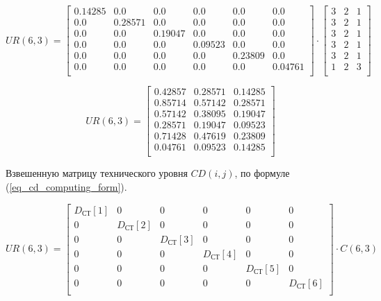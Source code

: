 $$
    UR(6,3) =
        \begin{bmatrix}
            0.14285 & 0.0     & 0.0     & 0.0     & 0.0     & 0.0     \\
            0.0     & 0.28571 & 0.0     & 0.0     & 0.0     & 0.0     \\
            0.0     & 0.0     & 0.19047 & 0.0     & 0.0     & 0.0     \\
            0.0     & 0.0     & 0.0     & 0.09523 & 0.0     & 0.0     \\
            0.0     & 0.0     & 0.0     & 0.0     & 0.23809 & 0.0     \\
            0.0     & 0.0     & 0.0     & 0.0     & 0.0     & 0.04761 \\
        \end{bmatrix}
        \cdot
        \begin{bmatrix}
            3 & 2 & 1 \\
            3 & 2 & 1 \\
            3 & 2 & 1 \\
            3 & 2 & 1 \\
            3 & 2 & 1 \\
            1 & 2 & 3 \\
        \end{bmatrix}
$$

\begin{equation}
    UR(6,3) =
        \begin{bmatrix}
            0.42857 & 0.28571 & 0.14285 \\
            0.85714 & 0.57142 & 0.28571 \\
            0.57142 & 0.38095 & 0.19047 \\
            0.28571 & 0.19047 & 0.09523 \\
            0.71428 & 0.47619 & 0.23809 \\
            0.04761 & 0.09523 & 0.14285 \\
        \end{bmatrix}
    \label{eq_ur_rez}
\end{equation}

Взвешенную матрицу технического уровня $CD(i, j)$, по формуле
(\ref{eq_cd_computing_form}).

\begin{equation}
    UR(6,3) =
        \begin{bmatrix}
            D_\text{СТ}[1] & 0 & 0 & 0 & 0 & 0 \\
            0 & D_\text{СТ}[2] & 0 & 0 & 0 & 0 \\
            0 & 0 & D_\text{СТ}[3] & 0 & 0 & 0 \\
            0 & 0 & 0 & D_\text{СТ}[4] & 0 & 0 \\
            0 & 0 & 0 & 0 & D_\text{СТ}[5] & 0 \\
            0 & 0 & 0 & 0 & 0 & D_\text{СТ}[6] \\
        \end{bmatrix}
        \cdot
        C(6,3)
    \label{eq_cd_computing_form}
\end{equation}

